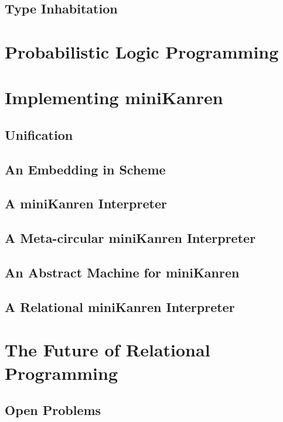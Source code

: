 \documentclass[11pt]{book}
\begin{document}
\begin{schemeregion}
\section{Type Inhabitation}

\chapter{Probabilistic Logic Programming}

\chapter{Implementing miniKanren}
\section{Unification}
\section{An Embedding in Scheme}
\section{A miniKanren Interpreter}
\section{A Meta-circular miniKanren Interpreter}
\section{An Abstract Machine for miniKanren}
\section{A Relational miniKanren Interpreter}

\chapter{The Future of Relational Programming}
\section{Open Problems}

\end{schemeregion}
\end{document}
